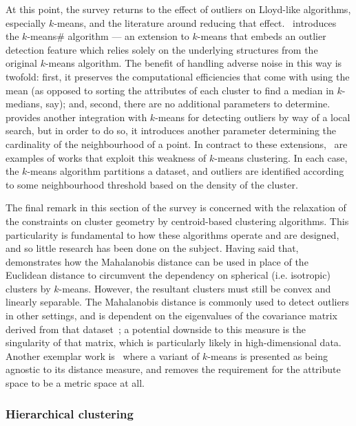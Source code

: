 At this point, the survey returns to the effect of outliers on Lloyd-like
algorithms, especially \(k\)-means, and the literature around reducing that
effect.~\cite{Olukanmi2017} introduces the \(k\)-means\# algorithm --- an
extension to \(k\)-means that embeds an outlier detection feature which relies
solely on the underlying structures from the original \(k\)-means algorithm.
The benefit of handling adverse noise in this way is twofold: first, it
preserves the computational efficiencies that come with using the mean (as
opposed to sorting the attributes of each cluster to find a median in
\(k\)-medians, say); and, second, there are no additional parameters to
determine.~\cite{Gupta2017} provides another integration with \(k\)-means for
detecting outliers by way of a local search, but in order to do so, it
introduces another parameter determining the cardinality of the neighbourhood of
a point. In contract to these extensions,~\cite{Lei2012,Wei2019} are examples of
works that exploit this weakness of \(k\)-means clustering. In each case, the
\(k\)-means algorithm partitions a dataset, and outliers are identified
according to some neighbourhood threshold based on the density of the cluster.

The final remark in this section of the survey is concerned with the relaxation
of the constraints on cluster geometry by centroid-based clustering algorithms.
This particularity is fundamental to how these algorithms operate and are
designed, and so little research has been done on the subject. Having said
that,~\cite{Sung1998} demonstrates how the Mahalanobis distance can be used in
place of the Euclidean distance to circumvent the dependency on spherical (i.e.
isotropic) clusters by \(k\)-means. However, the resultant clusters must still
be convex and linearly separable. The Mahalanobis distance is commonly used to
detect outliers in other settings, and is dependent on the eigenvalues of the
covariance matrix derived from that dataset~\cite{Mahalanobis1936}; a potential
downside to this measure is the singularity of that matrix, which is
particularly likely in high-dimensional data. Another exemplar work
is~\cite{Statman2020} where a variant of \(k\)-means is presented as being
agnostic to its distance measure, and removes the requirement for the attribute
space to be a metric space at all.

\subsubsection{Hierarchical clustering}

